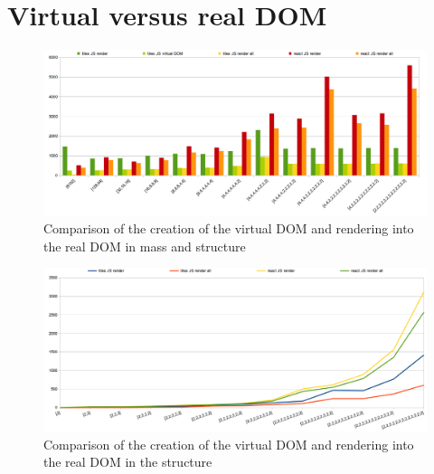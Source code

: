 \section{Virtual versus real DOM}\label{sec:benchmarks-clean-vs-dirty-update}

	\begin{figure}[h]
	\centering  
		\includegraphics[scale=0.5]{images/benchmarks/mvs_render_vs_virtual_.png}
		\caption{Comparison of the creation of the virtual DOM and rendering into the real DOM in mass and structure}
		\label{img:benchmarks-mass-vs-structure-virtual-vs-real}
	\end{figure}

	\begin{figure}[h]
	\centering  
		\includegraphics[scale=0.5]{images/benchmarks/s_render_all.png}
		\caption{Comparison of the creation of the virtual DOM and rendering into the real DOM in the structure}
		\label{img:benchmarks-structure-virtual-vs-real}
	\end{figure}

